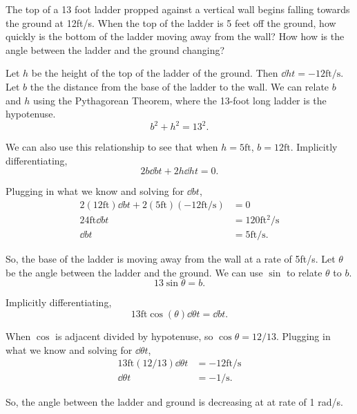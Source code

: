 \begin{example}
	The top of a 13 foot ladder propped against a vertical wall begins falling towards the ground at 12ft/s.
	When the top of the ladder is 5 feet off the ground, how quickly is the bottom of the ladder moving away from the wall?
	How how is the angle between the ladder and the ground changing?
\end{example}
\begin{answer}
	Let $h$ be the height of the top of the ladder of the ground.
	Then $\dd{h}{t} = -12\text{ft/s}$.
	Let $b$ the the distance from the base of the ladder to the wall.
	We can relate $b$ and $h$ using the Pythagorean Theorem, where the 13-foot long ladder is the hypotenuse.
	\begin{equation*}
		b^2 + h^2 = 13^2.
	\end{equation*}
	
	We can also use this relationship to see that when $h=5\text{ft}$, $b=12\text{ft}$.
	Implicitly differentiating,
	\begin{equation*}
		2b\dd{b}{t} + 2h\dd{h}{t} = 0.
	\end{equation*}
	
	Plugging in what we know and solving for $\dd{b}{t}$,
	\begin{align*}
		2(12\text{ft})\dd{b}{t} + 2(5\text{ft})(-12\text{ft/s}) &= 0 \\
		24\text{ft}\dd{b}{t} &= 120\text{ft$^2$/s} \\
		\dd{b}{t} &= 5\text{ft/s}.
	\end{align*}
	
	So, the base of the ladder is moving away from the wall at a rate of 5ft/s.
	Let $\theta$ be the angle between the ladder and the ground.
	We can use $\sin$ to relate $\theta$ to $b$.
	\begin{equation*}
		13\sin{\theta} = b.
	\end{equation*}
	
	Implicitly differentiating,
	\begin{equation*}
		13\text{ft}\cos{(\theta)}\dd{\theta}{t} = \dd{b}{t}.
	\end{equation*}
	
	When $\cos$ is adjacent divided by hypotenuse, so $\cos{\theta} = 12/13$.
	Plugging in what we know and solving for $\dd{\theta}{t}$,
	\begin{align*}
		13\text{ft}(12/13)\dd{\theta}{t} &= -12\text{ft/s} \\
		\dd{\theta}{t} &= -1\text{/s}.
	\end{align*}
	
	So, the angle between the ladder and ground is decreasing at at rate of 1 rad/s.
\end{answer}

